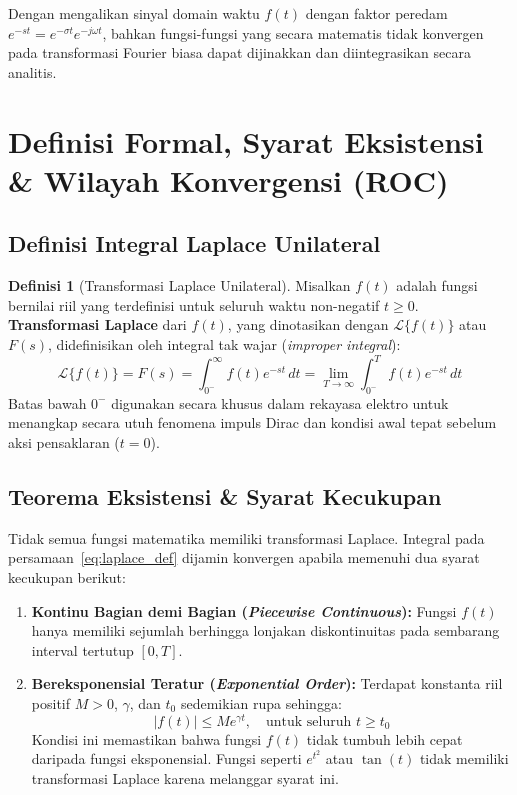 \documentclass[11pt,a4paper]{article}
\theoremstyle{definition}
\newtheorem{definition}{Definisi}[section]
\begin{document}
Dengan mengalikan sinyal domain waktu $f(t)$ dengan faktor peredam $e^{-st} = e^{-\sigma t} e^{-j\omega t}$, bahkan fungsi-fungsi yang secara matematis tidak konvergen pada transformasi Fourier biasa dapat dijinakkan dan diintegrasikan secara analitis.

\section{Definisi Formal, Syarat Eksistensi \& Wilayah Konvergensi (ROC)}

\subsection{Definisi Integral Laplace Unilateral}

\begin{definition}[Transformasi Laplace Unilateral]
Misalkan $f(t)$ adalah fungsi bernilai riil yang terdefinisi untuk seluruh waktu non-negatif $t \ge 0$. \textbf{Transformasi Laplace} dari $f(t)$, yang dinotasikan dengan $\mathcal{L}\{f(t)\}$ atau $F(s)$, didefinisikan oleh integral tak wajar (\textit{improper integral}):
\begin{equation}
    \mathcal{L}\{f(t)\} = F(s) = \int_{0^-}^{\infty} f(t) e^{-st} \, dt = \lim_{T \to \infty} \int_{0^-}^{T} f(t) e^{-st} \, dt
    \label{eq:laplace_def}
\end{equation}
Batas bawah $0^-$ digunakan secara khusus dalam rekayasa elektro untuk menangkap secara utuh fenomena impuls Dirac dan kondisi awal tepat sebelum aksi pensaklaran ($t = 0$).
\end{definition}

\subsection{Teorema Eksistensi \& Syarat Kecukupan}

Tidak semua fungsi matematika memiliki transformasi Laplace. Integral pada persamaan~\eqref{eq:laplace_def} dijamin konvergen apabila memenuhi dua syarat kecukupan berikut:
\begin{enumerate}[leftmargin=*]
    \item \textbf{Kontinu Bagian demi Bagian (\textit{Piecewise Continuous}):} Fungsi $f(t)$ hanya memiliki sejumlah berhingga lonjakan diskontinuitas pada sembarang interval tertutup $[0, T]$.
    \item \textbf{Bereksponensial Teratur (\textit{Exponential Order}):} Terdapat konstanta riil positif $M > 0$, $\gamma$, dan $t_0$ sedemikian rupa sehingga:
    \begin{equation}
        |f(t)| \le M e^{\gamma t}, \quad \text{untuk seluruh } t \ge t_0
        \label{eq:exponential_order}
    \end{equation}
    Kondisi ini memastikan bahwa fungsi $f(t)$ tidak tumbuh lebih cepat daripada fungsi eksponensial. Fungsi seperti $e^{t^2}$ atau $\tan(t)$ tidak memiliki transformasi Laplace karena melanggar syarat ini.
\end{enumerate}
\end{document}
